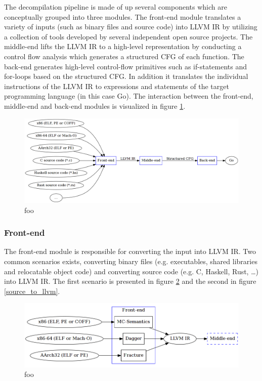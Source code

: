 \documentclass[12pt, a4paper]{article}
\begin{document}
The decompilation pipeline is made of up several components which are conceptually grouped into three modules. The front-end module translates a variety of inputs (such as binary files and source code) into LLVM IR by utilizing a collection of tools developed by several independent open source projects. The middle-end lifts the LLVM IR to a high-level representation by conducting a control flow analysis which generates a structured CFG of each function. The back-end generates high-level control-flow primitives such as if-statements and for-loops based on the structured CFG. In addition it translates the individual instructions of the LLVM IR to expressions and statements of the target programming language (in this case Go). The interaction between the front-end, middle-end and back-end modules is visualized in figure \ref{decompilation_pipeline}.

\begin{figure}[htbp]
	\begin{center}
		\includegraphics[width=\textwidth]{inc/decompilation_pipeline.png}
		\caption{foo}
		\label{decompilation_pipeline}
	\end{center}
\end{figure}


\subsubsection{Front-end}


The front-end module is responsible for converting the input into LLVM IR. Two common scenarios exists, converting binary files (e.g. executables, shared libraries and relocatable object code) and converting source code (e.g. C, Haskell, Rust, …) into LLVM IR. The first scenario is presented in figure \ref{binary_to_llvm} and the second in figure \ref{source_to_llvm}.


\begin{figure}[htbp]
	\begin{center}
		\includegraphics[width=\textwidth]{inc/front-end_binary.png}
		\caption{foo}
		\label{binary_to_llvm}
	\end{center}
\end{figure}
\end{document}
